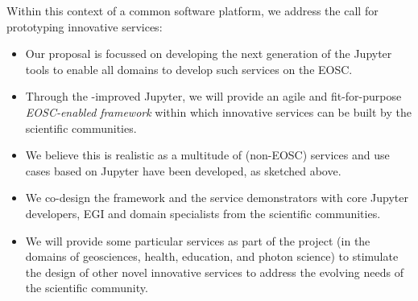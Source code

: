 Within this context of a common software platform, we address the call
for prototyping innovative services:
\begin{itemize}
\item Our \TheProject proposal is focussed on developing the next generation
of the Jupyter tools to enable all domains to develop such services on
the EOSC.

\item Through the \TheProject-improved Jupyter, we will provide an
  agile and fit-for-purpose \emph{EOSC-enabled
framework} within which innovative services can be built by the
scientific communities.

\item We believe this is realistic as a multitude of (non-EOSC) services and
  use cases based on Jupyter have been developed, as sketched above.

\item We co-design the framework and the service demonstrators with
  core Jupyter developers, EGI and domain specialists from the
  scientific communities.

\item We will provide some particular services as part of the project
  (in the domains of geosciences, health,  education, and photon
  science) to stimulate the design of other novel innovative services
  to address the evolving needs of the scientific community.
\end{itemize}
\bigskip


